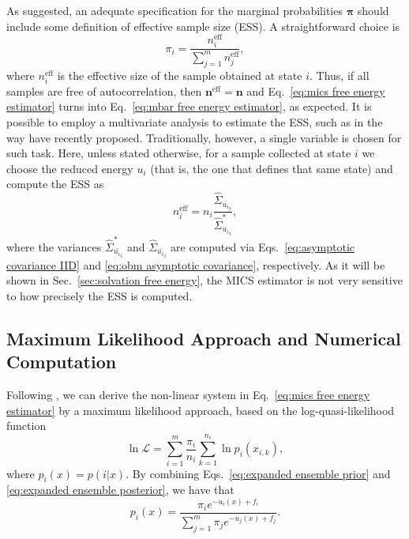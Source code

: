 \documentclass[journal=jctcce,manuscript=article,layout=twocolumn]{achemso}
\newcommand{\vt}[1]{\boldsymbol{\mathbf{#1}}}   %
\newcommand{\avg}[1]{\overline{#1}}             %
\begin{document}
As \citeauthor{Roy_2018} \cite{Roy_2018} suggested, an adequate specification for the marginal probabilities $\vt \pi$ should include some definition of effective sample size (ESS). A straightforward choice is
\begin{equation}
\label{eq:mics prior}
\pi_i = \frac{n^\text{eff}_i}{\sum_{j=1}^m n^\text{eff}_j},
\end{equation}
where $n^\text{eff}_i$ is the effective size of the sample obtained at state $i$. Thus, if all samples are free of autocorrelation, then ${\vt n}^\text{eff} = \vt n$ and Eq.~\eqref{eq:mics free energy estimator} turns into Eq.~\eqref{eq:mbar free energy estimator}, as expected. It is possible to employ a multivariate analysis to estimate the ESS, such as in the way \citeauthor{Vats_2015} \cite{Vats_2015, Vats_2018} have recently proposed. Traditionally, however, a single variable is chosen for such task. Here, unless stated otherwise, for a sample collected at state $i$ we choose the reduced energy $u_i$ (that is, the one that defines that same state) and compute the ESS as
\begin{equation*}
n^\text{eff}_i = n_i \frac{\hat{\Sigma}_{\avg{u_i}_i}}{\hat{\Sigma}^\ast_{\avg{u_i}_i}},
\end{equation*}
where the variances $\hat{\Sigma}_{\avg{u_i}_i}^\ast$ and $\hat{\Sigma}_{\avg{u_i}_i}$ are computed via Eqs.~\eqref{eq:asymptotic covariance IID} and \eqref{eq:obm asymptotic covariance}, respectively. As it will be shown in Sec.~\ref{sec:solvation free energy}, the MICS estimator is not very sensitive to how precisely the ESS is computed.

\subsection{Maximum Likelihood Approach and Numerical Computation}
\label{sec:maximum likelihood}

Following \citeauthor{Doss_2014} \cite{Doss_2014}, we can derive the non-linear system in Eq.~\eqref{eq:mics free energy estimator} by a maximum likelihood approach, based on the log-quasi-likelihood function \cite{Doss_2014, Tan_2015, Roy_2018}
\begin{equation}
\label{eq:mics log-quasi-likelihood}
\ln \mathcal L = \sum_{i=1}^m \frac{\pi_i}{n_i} \sum_{k=1}^{n_i} \ln p_i(x_{i,k}),
\end{equation}
where $p_i(x) = p(i|x)$. By combining Eqs.~\eqref{eq:expanded ensemble prior} and \eqref{eq:expanded ensemble posterior}, we have that
\begin{equation}
\label{eq:mixture posterior probability}
p_i(x) = \frac{\pi_i e^{-u_i(x) + f_i}}{\sum_{j=1}^m \pi_j e^{-u_j(x) + f_j}}.
\end{equation}
\end{document}
